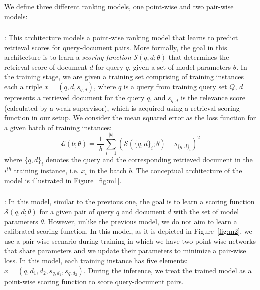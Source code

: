 We define three different ranking models, one point-wise and two pair-wise models:

\subsubsection{\label{sec:modelone}\Modelone}: This architecture models a point-wise ranking model that learns to predict retrieval scores for query-document pairs. More formally, the goal in this architecture is to learn a \emph{scoring function} $\mathcal{S}(q, d; \theta)$ that determines the retrieval score of document $d$ for query $q$, given a set of model parameters $\theta$.
%
In the training stage, we are given a training set comprising of training instances each a triple $x = (q,d, s_{q,d})$, where $q$ is a query from training query set $Q$, $d$ represents a retrieved document for the query $q$, and $s_{q,d}$ is the relevance score (calculated by a weak supervisor), which is acquired using a retrieval scoring function in our setup.
%
We consider the mean squared error as the loss function for a given batch of training instances:
\begin{equation}
\mathcal{L}(b; \theta) = \frac{1}{|b|} \sum_{i=1}^{|b|}{(\mathcal{S}(\{q, d\}_i; \theta) - s_{\{q, d\}_i})^2}
\end{equation}
where $\{q, d\}_i$ denotes the query and the corresponding retrieved document in the $i^{th}$ training instance, i.e. $x_i$ in the batch $b$.
The conceptual architecture of the model is illustrated in Figure~\ref{fig:m1}.


\subsubsection{\label{sec:modeltwo}\Modeltwo}:
In this model, similar to the previous one, the goal is to learn a scoring function $\mathcal{S}(q, d; \theta)$ for a given pair of query $q$ and document $d$ with the set of model parameters $\theta$. 
However, unlike the previous model, we do not aim to learn a calibrated scoring function. 
In this model, as it is depicted in Figure~\ref{fig:m2}, we use a pair-wise scenario during training in which we have two point-wise networks that share parameters and we update their parameters to minimize a pair-wise loss.
In this model, each training instance has five elements: $x = (q,d_1, d_2, s_{q,d_1}, s_{q,d_2})$.
During the inference, we treat the trained model as a point-wise scoring function to score query-document pairs.

